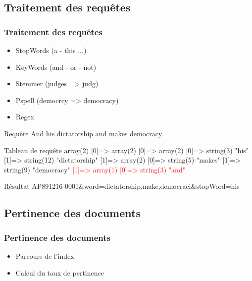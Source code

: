 \documentclass{beamer}
\begin{document}
    
    \subsection{Traitement des requêtes}  
    \begin{frame}
     \frametitle{Traitement des requêtes}
     \begin{itemize}
      \item StopWords (a - this ...)
      \item KeyWords (and - or - not)
      \item Stemmer (judges => judg)
      \item Pspell (democrcy => democracy)
      \item Regex
     \end{itemize}
     
    \end{frame}
     
     \begin{frame}
	\begin{block}{Requête}
	And his dictatorship and makes democracy
	\end{block}
	
	\begin{block}{Tableau de requête}
	  array(2) { [0]=> array(2) { [0]=> array(2) { [0]=> string(3) "his" [1]=> string(12) 
    "dictatorship"} [1]=> array(2) { [0]=> string(5) "makes" [1]=> string(9) "democracy"} 
    \textcolor{red}{[1]=> array(1) { [0]=> string(3) "and" } } }}		
	\end{block}
	
	\begin{block}{Résultat}
	AP891216-0001\&word=dictatorship,make,democraci\&stopWord=his
	\end{block}

	
    \end{frame}

   
    
    \subsection{Pertinence des documents}  
    \begin{frame}
     \frametitle{Pertinence des documents}
     \begin{itemize}
     \item Parcours de l'index
      \item Calcul du taux de pertinence
     \end{itemize}

    \end{frame}
    
\end{document}
